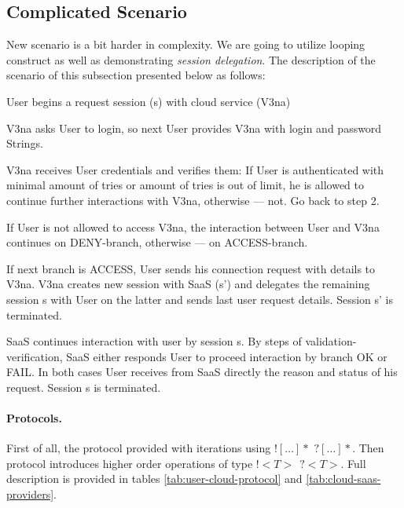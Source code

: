 \documentclass{llncs}
\begin{document}
\subsection{Complicated Scenario}
New scenario is a bit harder in complexity. We are going to utilize looping construct as well as demonstrating \textit{session delegation}. The description of the scenario of this subsection presented below as follows:
\begin{compactenum}
\item  User begins a request session (s) with cloud service (V3na)

\item  V3na asks User to login, so next User provides V3na with login and password Strings.

\item  V3na receives User credentials and verifies them: If User is authenticated with minimal amount of tries or amount of tries is out of limit, he is allowed to continue further interactions with V3na, otherwise --- not. Go back to step 2.

\item  If User is not allowed to access V3na, the interaction between User and V3na continues on DENY-branch, otherwise --- on ACCESS-branch.

\item  If next branch is ACCESS, User sends his connection request with details to V3na. V3na creates new session with SaaS (s') and delegates the remaining session s with User on the latter and sends last user request details. Session s' is terminated.

\item  SaaS continues interaction with user by session s. By steps of validation-verification, SaaS either responds User to proceed interaction by branch OK or FAIL. In both cases User receives from SaaS directly the reason and status of his request. Session s is terminated.
\end{compactenum}

\paragraph{Protocols.} First of all, the protocol provided with iterations using $![\dots]*$ $?[\dots]*$. Then protocol introduces higher order operations of type $!<T>\ \ ?<T>$. Full description is provided in tables \ref{tab:user-cloud-protocol} and \ref{tab:cloud-saas-providers}.
\end{document}
